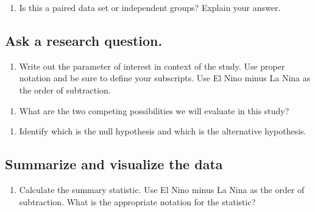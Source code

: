 \documentclass[
]{report}
\providecommand{\tightlist}{%
  \setlength{\itemsep}{0pt}\setlength{\parskip}{0pt}}
\begin{document}
\vspace{1in}

\begin{enumerate}
\def\labelenumi{\arabic{enumi}.}
\setcounter{enumi}{4}
\tightlist
\item
  Is this a paired data set or independent groups? Explain your answer.
\end{enumerate}

\vspace{1in}

\hypertarget{ask-a-research-question.}{%
\subsection{Ask a research question.}\label{ask-a-research-question.}}

\begin{enumerate}
\def\labelenumi{\arabic{enumi}.}
\setcounter{enumi}{5}
\tightlist
\item
  Write out the parameter of interest in context of the study. Use proper notation and be sure to define your subscripts. Use El Nino minus La Nina as the order of subtraction.
\end{enumerate}

\vspace{1in}

\begin{enumerate}
\def\labelenumi{\arabic{enumi}.}
\setcounter{enumi}{6}
\tightlist
\item
  What are the two competing possibilities we will evaluate in this study?
\end{enumerate}

\vspace{1in}

\begin{enumerate}
\def\labelenumi{\arabic{enumi}.}
\setcounter{enumi}{7}
\tightlist
\item
  Identify which is the null hypothesis and which is the alternative hypothesis.
\end{enumerate}

\vspace{1in}

\hypertarget{summarize-and-visualize-the-data}{%
\subsection{Summarize and visualize the data}\label{summarize-and-visualize-the-data}}

\begin{enumerate}
\def\labelenumi{\arabic{enumi}.}
\setcounter{enumi}{8}
\tightlist
\item
  Calculate the summary statistic. Use El Nino minus La Nina as the order of subtraction. What is the appropriate notation for the statistic?
\end{enumerate}
\end{document}
